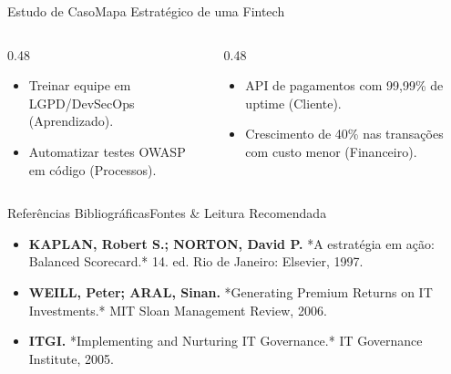 \begin{senaiframe}{Estudo de Caso}{Mapa Estratégico de uma Fintech}
  \begin{columns}[t]
    \begin{column}{0.48\textwidth}
      \begin{tcolorbox}[senaibluecard, title={Iniciativas Mapeadas}]
        \begin{itemize}
          \item Treinar equipe em LGPD/DevSecOps (Aprendizado).
          \item Automatizar testes OWASP em código (Processos).
        \end{itemize}
      \end{tcolorbox}
    \end{column}
    \begin{column}{0.48\textwidth}
      \begin{tcolorbox}[senaigreencard, title={Resultados Alcançados}]
        \begin{itemize}
          \item API de pagamentos com 99,99\% de uptime (Cliente).
          \item Crescimento de 40\% nas transações com custo menor (Financeiro).
        \end{itemize}
      \end{tcolorbox}
    \end{column}
  \end{columns}
\end{senaiframe}

\begin{senaiframe}{Referências Bibliográficas}{Fontes \& Leitura Recomendada}
  \vspace{0.5cm}
  \begin{tcolorbox}[senaicard, title={Obras de Referência}]
    \begin{itemize}
      \item \textbf{KAPLAN, Robert S.; NORTON, David P.} *A estratégia em ação: Balanced Scorecard.* 14. ed. Rio de Janeiro: Elsevier, 1997.
      \item \textbf{WEILL, Peter; ARAL, Sinan.} *Generating Premium Returns on IT Investments.* MIT Sloan Management Review, 2006.
      \item \textbf{ITGI.} *Implementing and Nurturing IT Governance.* IT Governance Institute, 2005.
    \end{itemize}
  \end{tcolorbox}
\end{senaiframe}

